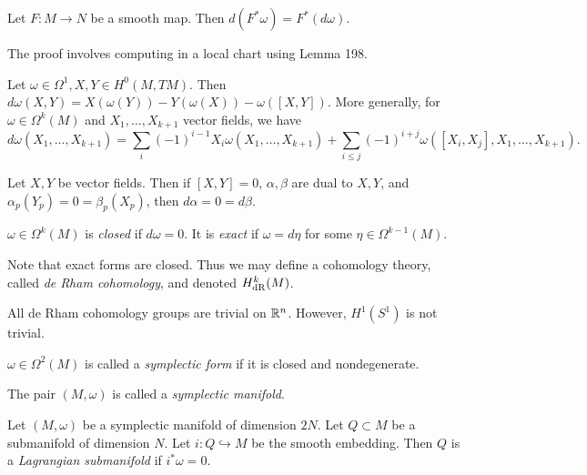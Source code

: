 \documentclass[twoside, 10pt]{article}
\begin{document}
    \begin{lem}
        Let $F:M \to N$ be a smooth map. Then $d(F^*\omega) = F^*(d\omega)$.
    \end{lem}

    The proof involves computing in a local chart using Lemma 198.

    \begin{prop}
        Let $\omega \in \Omega^1, X,Y \in H^0(M,TM)$. Then $d \omega(X,Y) = X(\omega(Y)) - Y(\omega(X)) - \omega([X,Y])$. More generally, for $\omega \in \Omega^k(M)$ and $X_1, \ldots, X_{k+1}$ vector fields, we have
        \[ d\omega(X_1, \ldots, X_{k+1}) = \sum_i (-1)^{i-1} X_i \omega(X_1, \ldots, X_{k+1}) + \sum_{i\leq j} (-1)^{i+j} \omega([X_i,X_j], X_1, \ldots, X_{k+1}). \]
    \end{prop}

    \begin{exm}
        Let $X,Y$ be vector fields. Then if $[X,Y] = 0$, $\alpha,\beta$ are dual to $X,Y$, and $\alpha_p(Y_p) = 0 = \beta_p(X_p)$, then $d\alpha = 0 = d\beta$.
    \end{exm}

    \begin{defn}
        $\omega \in \Omega^k(M)$ is \textit{closed} if $d\omega = 0$. It is \textit{exact} if $\omega = d\eta$ for some $\eta \in \Omega^{k-1}(M)$.
    \end{defn}

    Note that exact forms are closed. Thus we may define a cohomology theory, called \textit{de Rham cohomology}, and denoted $H^k_{\mathrm{dR}}(M)$.

    \begin{exm}
        All de Rham cohomology groups are trivial on $\mathbb{R}^n$. However, $H^1(S^1)$ is not trivial.
    \end{exm}

    \begin{defn}
        $\omega \in \Omega^2(M)$ is called a \textit{symplectic form} if it is closed and nondegenerate.
    \end{defn}
    
    The pair $(M,\omega)$ is called a \textit{symplectic manifold}.

    \begin{defn}
        Let $(M,\omega)$ be a symplectic manifold of dimension $2N$. Let $Q \subset M$ be a submanifold of dimension $N$. Let $i:Q \hookrightarrow M$ be the smooth embedding. Then $Q$ is a \textit{Lagrangian submanifold} if $i^*\omega = 0$.
    \end{defn}
\end{document}
